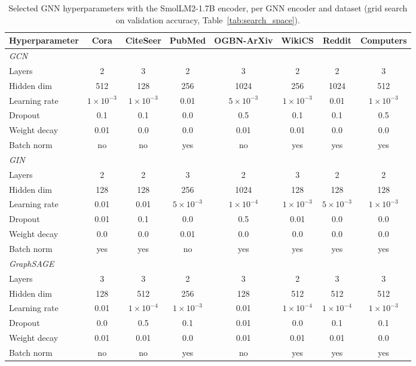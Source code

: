 \documentclass[a4paper,fleqn]{cas-sc}
\begin{document}
\begin{table}[htbp]
\centering\color{red}
\caption{Selected GNN hyperparameters with the SmolLM2-1.7B encoder, per GNN encoder and dataset (grid search on validation accuracy, Table~\ref{tab:search_space}).}
\label{tab:gnn_hp_smollm}
\footnotesize
\setlength{\tabcolsep}{3pt}
\begin{tabular*}{\textwidth}{@{\extracolsep{\fill}} lccccccc @{}}
\toprule
\textbf{Hyperparameter} & \textbf{Cora} & \textbf{CiteSeer} & \textbf{PubMed} & \textbf{OGBN-ArXiv} & \textbf{WikiCS} & \textbf{Reddit} & \textbf{Computers} \\
\midrule
\multicolumn{8}{l}{\textit{GCN}} \\
\midrule
Layers & 2 & 3 & 2 & 3 & 2 & 2 & 3 \\
Hidden dim & 512 & 128 & 256 & 1024 & 256 & 1024 & 512 \\
Learning rate & $1\times10^{-3}$ & $1\times10^{-3}$ & 0.01 & $5\times10^{-3}$ & $1\times10^{-3}$ & 0.01 & $1\times10^{-3}$ \\
Dropout & 0.1 & 0.1 & 0.0 & 0.5 & 0.1 & 0.1 & 0.5 \\
Weight decay & 0.01 & 0.0 & 0.0 & 0.01 & 0.01 & 0.0 & 0.0 \\
Batch norm & no & no & yes & no & yes & yes & yes \\
\midrule
\multicolumn{8}{l}{\textit{GIN}} \\
\midrule
Layers & 2 & 2 & 3 & 2 & 3 & 2 & 2 \\
Hidden dim & 128 & 128 & 256 & 1024 & 128 & 128 & 128 \\
Learning rate & 0.01 & 0.01 & $5\times10^{-3}$ & $1\times10^{-4}$ & $1\times10^{-3}$ & $5\times10^{-3}$ & $1\times10^{-3}$ \\
Dropout & 0.01 & 0.1 & 0.0 & 0.5 & 0.01 & 0.0 & 0.0 \\
Weight decay & 0.0 & 0.0 & 0.01 & 0.0 & 0.0 & 0.0 & 0.0 \\
Batch norm & yes & yes & no & yes & yes & yes & yes \\
\midrule
\multicolumn{8}{l}{\textit{GraphSAGE}} \\
\midrule
Layers & 3 & 3 & 2 & 3 & 2 & 3 & 3 \\
Hidden dim & 128 & 512 & 256 & 128 & 512 & 512 & 512 \\
Learning rate & 0.01 & $1\times10^{-4}$ & $1\times10^{-3}$ & 0.01 & $1\times10^{-4}$ & $1\times10^{-4}$ & $1\times10^{-3}$ \\
Dropout & 0.0 & 0.5 & 0.1 & 0.01 & 0.0 & 0.1 & 0.1 \\
Weight decay & 0.01 & 0.01 & 0.0 & 0.01 & 0.01 & 0.01 & 0.0 \\
Batch norm & no & no & yes & no & yes & yes & yes \\
\bottomrule
\end{tabular*}
\end{table}
\end{document}

